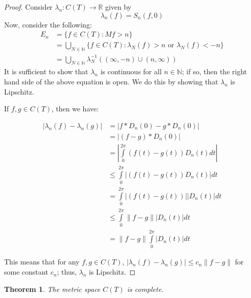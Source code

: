 \documentclass{amsart}
\newcommand{\la}{\lambda}
\newcommand{\N}{\mathbb{N}}
\newcommand{\R}{\mathbb{R}}
\newcommand{\absval}[1]{\left| #1 \right|}
\newcommand{\norm}[1]{\|#1\|}
\newtheorem{thm}{Theorem}[section]
\theoremstyle{definition}
\begin{document}
\begin{proof}
Consider $\la_n: C(T) \to \R$ given by
\begin{displaymath}
\la_n(f) = S_n(f,0)
\end{displaymath}
Now, consider the following:
\begin{align*}
E_n &= \{f \in C(T): Mf> n\} \\
&= \bigcup\limits_{N \in \N} \{f \in C(T) : \la_N (f)> n \textrm{ or } \la_N(f) < -n\}\\
&= \bigcup\limits_{N \in \N} \la_N^{-1}((\infty, -n) \cup (n, \infty))
\end{align*}
It is sufficient to show that $\la_n$ is continuous for all $n \in \N$; if so, then the right hand side of the above equation is open.
We do this by showing that $\la_n$ is Lipschitz.

If $f, g \in C(T)$, then we have:

\begin{align*}
\absval{\la_n(f) - \la_n(g)} &= \absval{f \ast D_n(0) - g \ast D_n(0)} \\
&= \absval{(f-g) \ast D_n(0)} \\
&= \absval{\int\limits_0^{2\pi} (f(t)-g(t))D_n(t)dt} \\
&\leq \int\limits_0^{2\pi} \absval{(f(t)-g(t))D_n(t)}dt \\
&= \int\limits_0^{2\pi} \absval{(f(t)-g(t))}\absval{D_n(t)}dt \\
&\leq \int\limits_0^{2\pi} \norm{f-g}\absval{D_n(t)}dt \\
&= \norm{f-g} \int\limits_0^{2\pi} \absval{D_n(t)}dt
\end{align*}

This means that for any $f,g \in C(T)$, $\absval{\la_n(f) - \la_n(g)} \leq c_n \norm{f-g}$ for some constant $c_n$; thus, $\la_n$ is Lipschitz.

\end{proof}

\begin{thm}
The metric space $C(T)$ is complete.
\end{thm}
\end{document}

